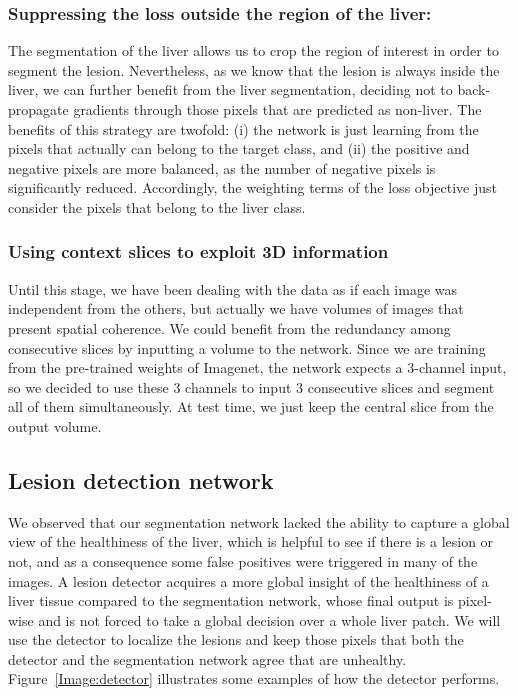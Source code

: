 \documentclass{article}
\begin{document}
\subsubsection{Suppressing the loss outside the region of the liver:}

The segmentation of the liver allows us to crop the region of interest in order to segment the lesion. Nevertheless, as we know that the lesion is always inside the liver, we can further benefit from the liver segmentation, deciding not to back-propagate gradients through those pixels that are predicted as non-liver. The benefits of this strategy are twofold: (i) the network is just learning from the pixels that actually can belong to the target class, and (ii) the positive and negative pixels are more balanced, as the number of negative pixels is significantly reduced. Accordingly, the weighting terms of the loss objective just consider the pixels that belong to the liver class. 

\subsubsection{Using context slices to exploit 3D information}
\label{sec:3-slices}
Until this stage, we have been dealing with the data as if each image was independent from the others, but actually we have volumes of images that present spatial coherence. We could benefit from the redundancy among consecutive slices by inputting a volume to the network.  Since we are training from the pre-trained weights of  Imagenet, the network  expects a 3-channel input, so we decided to use these 3 channels to input 3 consecutive slices and segment all of them simultaneously. At test time, we just keep the central slice from the output volume. 

\subsection{Lesion detection network}
\label{sec:detection}
We observed that our segmentation network lacked the ability to capture a global view of the healthiness of the liver, which is helpful to see if there is a lesion or not, and as a consequence some false positives were triggered in many of the images. A lesion detector acquires a more global insight of the healthiness of a liver tissue compared to the segmentation network, whose final output is pixel-wise and is not forced to take a global decision over a whole liver patch. We will use the detector to localize the lesions and keep those pixels that both the detector and the segmentation network agree that are unhealthy. Figure~\ref{Image:detector} illustrates some examples of how the detector performs.
\end{document}
